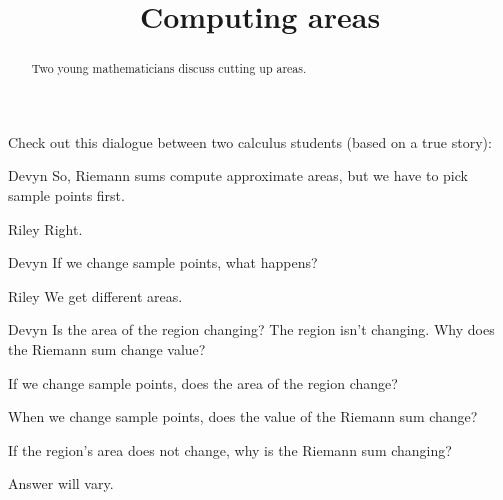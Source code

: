 \documentclass{ximera}
\title[Break-Ground:]{Computing areas}
\begin{document}
\begin{abstract}
Two young mathematicians discuss cutting up areas.
\end{abstract}
\maketitle

Check out this dialogue between two calculus students (based on a true
story):



\begin{dialogue}
	\item[Devyn] So, Riemann sums compute approximate areas, but we have to pick sample points first.
	\item[Riley] Right.
	\item[Devyn] If we change sample points, what happens?
	\item[Riley] We get different areas.
	\item[Devyn] Is the area of the region changing?  The region isn't changing.  Why does the Riemann sum change value?
\end{dialogue}

\begin{problem}
	If we change sample points, does the area of the region change?
  \begin{multipleChoice}
  \end{multipleChoice}
\end{problem}

\begin{problem}
	When we change sample points, does the value of the Riemann sum change?
  \begin{multipleChoice}
  \end{multipleChoice}
\end{problem}

\begin{problem}
	If the region's area does not change, why is the Riemann sum changing?
	\begin{freeResponse}
		Answer will vary.
	\end{freeResponse}
\end{problem}



%
\end{document}
